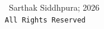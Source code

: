 \thispagestyle{empty}
\vspace*{\fill}
\begin{center}
    {\large \textcopyright\ Sarthak Siddhpura; 2026} \\
    \vspace{0.2cm}
    {\large \texttt{All Rights Reserved}}
\end{center}
\vspace*{\fill}
\newpage
